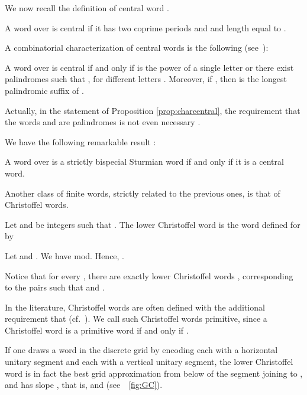 \documentclass{llncs}
\begin{document}
We now recall the definition of central word \cite{DelMi94}.

\begin{definition}
A word over  is central if it has two coprime periods  and  and length equal to .
\end{definition}

A combinatorial characterization of central words is the following (see~\cite{Del97}):

\begin{proposition}\label{prop:charcentral}
A word  over  is central if and only if  is the power of a single letter or there exist palindromes  such that , for different letters . Moreover, if , then  is the longest palindromic suffix of .
\end{proposition}

Actually, in the statement of Proposition \ref{prop:charcentral}, the requirement that the words  and   are palindromes is not even necessary \cite{CarDel05}.

We have the following remarkable result \cite{DelMi94}:

\begin{proposition}\label{prop:sbscen}
A word over  is a strictly bispecial Sturmian word if and only if it is a central word.
\end{proposition}

Another class of finite words, strictly related to the previous ones, is that of Christoffel words.

\begin{definition}
Let  and  be integers such that . The lower Christoffel word  is the word defined for  by

\end{definition}

\begin{example}
 Let  and . We have  mod. Hence, .
\end{example}

Notice that for every , there are exactly  lower Christoffel words , corresponding to the  pairs  such that  and . 

\begin{remark}
In the literature, Christoffel words are often defined with the additional requirement that  (cf.~\cite{Book08}). We call such Christoffel words primitive, since a Christoffel word is a primitive word if and only if .
\end{remark}

If one draws a word in the discrete grid  by encoding each  with a horizontal unitary segment and each  with a vertical unitary segment, the lower Christoffel word  is in fact the best grid approximation from below of the segment joining  to , and has slope , that is,  and   (see~\figurename~\ref{fig:GC}).
\end{document}

